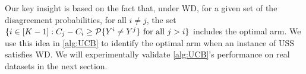 %
Our key insight is based on the fact that,
under WD, for a given set of the disagreement probabilities, for all $i \neq j$, the set $\{i \in [K-1]: C_j - C_i \geq \P\{Y^i \neq Y^j\} \mbox{ for all } j>i\}$ includes the optimal arm. We use this idea in \cref{alg:UCB} to identify the optimal arm when an instance of USS satisfies WD. We will experimentally validate \cref{alg:UCB}'s performance on real datasets in the next section.

